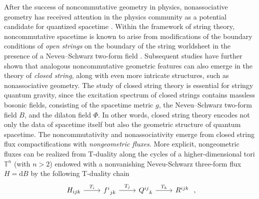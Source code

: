 \documentclass[reqno]{amsart}
\theoremstyle{definition}
\theoremstyle{remark}
\renewcommand{\d}{\text{d}}
\begin{document}
    After the success of noncommutative geometry in physics, nonassociative geometry has received attention in the physics community as a potential candidate for quantized spacetime \cite{PhysRevD.62.081501,nesterov2019nonassociative}. Within the framework of string theory, noncommutative spacetime is known to arise from modifications of the boundary conditions of \textit{open strings} on the boundary of the string worldsheet in the presence of a Neveu–Schwarz two-form field \cite{seiberg1999string,blumenhagen2014course}. Subsequent studies have further shown that analogous noncommutative geometric features can also emerge in the theory of \textit{closed string}, along with even more intricate structures, such as nonassociative geometry. The study of closed string theory is essential for stringy quantum gravity, since the excitation spectrum of closed strings contains massless bosonic fields, consisting of the spacetime metric $g$, the Neveu–Schwarz two-form field $B$, and the dilaton field $\Phi$. In other words, closed string theory encodes not only the data of spacetime itself but also the geometric structure of quantum spacetime. The noncommutativity and nonassociativity emerge from closed string flux compactifications with \textit{nongeometric fluxes}. More explicit, nongeometric fluxes can be realized from T-duality along the cycles of a higher-dimensional tori $\mathbb{T}^n$ (with $n>2$) endowed with a nonvanishing Neveu-Schwarz three-form flux $H=\d B$ by the following T-duality chain
   \[\begin{tikzcd}
       H_{ijk} \arrow{r}{T_i} & {f^i}_{jk} \arrow{r}{T_j} & {Q^{ij}}_k \arrow{r}{T_k} & {R^{ijk}}
    \end{tikzcd}\;,
    \]
\end{document}
